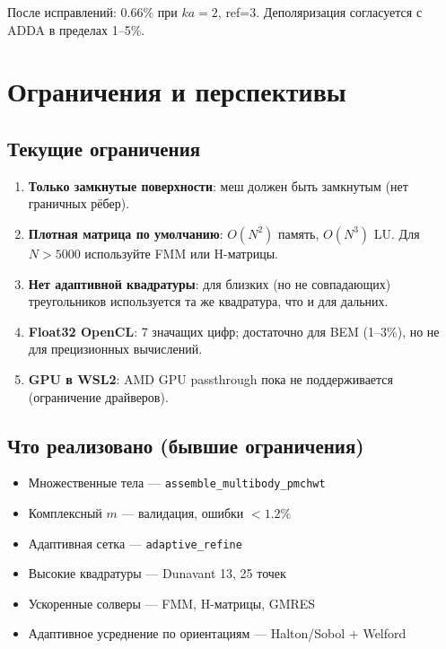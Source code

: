 \documentclass[12pt,a4paper]{article}
\begin{document}
После исправлений: 0.66\% при $ka=2$, ref=3. Деполяризация согласуется с ADDA в пределах 1--5\%.


\section{Ограничения и перспективы}

\subsection{Текущие ограничения}

\begin{enumerate}
  \item \textbf{Только замкнутые поверхности}: меш должен быть замкнутым (нет граничных рёбер).
  \item \textbf{Плотная матрица по умолчанию}: $O(N^2)$ память, $O(N^3)$ LU. Для $N > 5000$ используйте FMM или H-матрицы.
  \item \textbf{Нет адаптивной квадратуры}: для близких (но не совпадающих) треугольников используется та же квадратура, что и для дальних.
  \item \textbf{Float32 OpenCL}: 7 значащих цифр; достаточно для BEM (1--3\%), но не для прецизионных вычислений.
  \item \textbf{GPU в WSL2}: AMD GPU passthrough пока не поддерживается (ограничение драйверов).
\end{enumerate}

\subsection{Что реализовано (бывшие ограничения)}

\begin{itemize}
  \item[$\checkmark$] Множественные тела --- \texttt{assemble\_multibody\_pmchwt}
  \item[$\checkmark$] Комплексный $m$ --- валидация, ошибки $< 1.2\%$
  \item[$\checkmark$] Адаптивная сетка --- \texttt{adaptive\_refine}
  \item[$\checkmark$] Высокие квадратуры --- Dunavant 13, 25 точек
  \item[$\checkmark$] Ускоренные солверы --- FMM, H-матрицы, GMRES
  \item[$\checkmark$] Адаптивное усреднение по ориентациям --- Halton/Sobol + Welford
\end{itemize}
\end{document}
